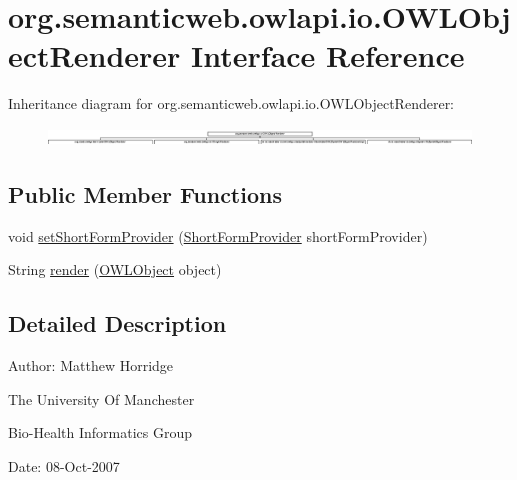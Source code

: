 \hypertarget{interfaceorg_1_1semanticweb_1_1owlapi_1_1io_1_1_o_w_l_object_renderer}{\section{org.\-semanticweb.\-owlapi.\-io.\-O\-W\-L\-Object\-Renderer Interface Reference}
\label{interfaceorg_1_1semanticweb_1_1owlapi_1_1io_1_1_o_w_l_object_renderer}
}
Inheritance diagram for org.\-semanticweb.\-owlapi.\-io.\-O\-W\-L\-Object\-Renderer\-:\begin{figure}[H]
\begin{center}
\leavevmode
\includegraphics[height=0.474576cm]{interfaceorg_1_1semanticweb_1_1owlapi_1_1io_1_1_o_w_l_object_renderer}
\end{center}
\end{figure}
\subsection*{Public Member Functions}
\begin{DoxyCompactItemize}
\item 
void \hyperlink{interfaceorg_1_1semanticweb_1_1owlapi_1_1io_1_1_o_w_l_object_renderer_a81a2a2daa40214a19a0a328950a943e4}{set\-Short\-Form\-Provider} (\hyperlink{interfaceorg_1_1semanticweb_1_1owlapi_1_1util_1_1_short_form_provider}{Short\-Form\-Provider} short\-Form\-Provider)
\item 
String \hyperlink{interfaceorg_1_1semanticweb_1_1owlapi_1_1io_1_1_o_w_l_object_renderer_a5507891b1a694586357b464a4320e914}{render} (\hyperlink{interfaceorg_1_1semanticweb_1_1owlapi_1_1model_1_1_o_w_l_object}{O\-W\-L\-Object} object)
\end{DoxyCompactItemize}


\subsection{Detailed Description}
Author\-: Matthew Horridge\par
 The University Of Manchester\par
 Bio-\/\-Health Informatics Group\par
 Date\-: 08-\/\-Oct-\/2007\par
\par


